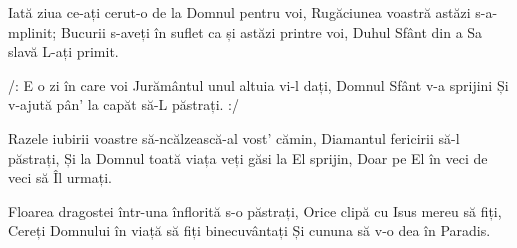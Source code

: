 \beginverse
Iată ziua ce-ați cerut-o de la Domnul pentru voi,
Rugăciunea voastră astăzi s-a-mplinit;
Bucurii s-aveți în suflet ca și astăzi printre voi,
Duhul Sfânt din a Sa slavă L-ați primit.
\endverse

\beginchorus
/: E o zi în care voi
Jurământul unul altuia vi-l dați,
Domnul Sfânt v-a sprijini
Și v-ajută pân’ la capăt să-L păstrați. :/
\endchorus

\beginverse
Razele iubirii voastre să-ncălzească-al vost’ cămin,
Diamantul fericirii să-l păstrați,
Și la Domnul toată viața veți găsi la El sprijin,
Doar pe El în veci de veci să Îl urmați.
\endverse

\beginverse
Floarea dragostei într-una înflorită s-o păstrați,
Orice clipă cu Isus mereu să fiți,
Cereți Domnului în viață să fiți binecuvântați
Și cununa să v-o dea în Paradis.
\endverse
\endsong